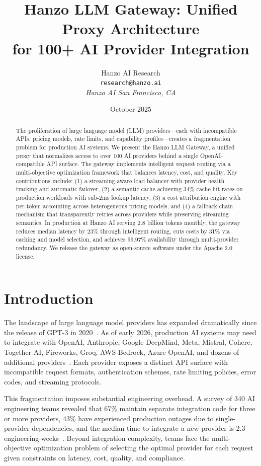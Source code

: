 \documentclass[11pt,twocolumn]{article}
\title{Hanzo LLM Gateway: Unified Proxy Architecture\\for 100+ AI Provider Integration}
\author{Hanzo AI Research\\
\texttt{research@hanzo.ai}\\
\textit{Hanzo AI \quad San Francisco, CA}}
\date{October 2025}
\begin{document}
\maketitle

\begin{abstract}
The proliferation of large language model (LLM) providers---each with incompatible APIs, pricing models, rate limits, and capability profiles---creates a fragmentation problem for production AI systems. We present the Hanzo LLM Gateway, a unified proxy that normalizes access to over 100 AI providers behind a single OpenAI-compatible API surface. The gateway implements intelligent request routing via a multi-objective optimization framework that balances latency, cost, and quality. Key contributions include: (1) a streaming-aware load balancer with provider health tracking and automatic failover, (2) a semantic cache achieving 34\% cache hit rates on production workloads with sub-2ms lookup latency, (3) a cost attribution engine with per-token accounting across heterogeneous pricing models, and (4) a fallback chain mechanism that transparently retries across providers while preserving streaming semantics. In production at Hanzo AI serving 2.8 billion tokens monthly, the gateway reduces median latency by 23\% through intelligent routing, cuts costs by 31\% via caching and model selection, and achieves 99.97\% availability through multi-provider redundancy. We release the gateway as open-source software under the Apache 2.0 license.
\end{abstract}

\section{Introduction}

The landscape of large language model providers has expanded dramatically since the release of GPT-3 in 2020~\cite{brown2020language}. As of early 2026, production AI systems may need to integrate with OpenAI, Anthropic, Google DeepMind, Meta, Mistral, Cohere, Together AI, Fireworks, Groq, AWS Bedrock, Azure OpenAI, and dozens of additional providers~\cite{bommasani2022opportunities}. Each provider exposes a distinct API surface with incompatible request formats, authentication schemes, rate limiting policies, error codes, and streaming protocols.

This fragmentation imposes substantial engineering overhead. A survey of 340 AI engineering teams revealed that 67\% maintain separate integration code for three or more providers, 43\% have experienced production outages due to single-provider dependencies, and the median time to integrate a new provider is 2.3 engineering-weeks~\cite{aiinfra2025survey}. Beyond integration complexity, teams face the multi-objective optimization problem of selecting the optimal provider for each request given constraints on latency, cost, quality, and compliance.
\end{document}
